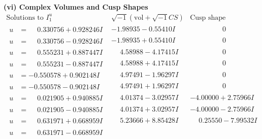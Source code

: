 \documentclass[1p]{elsarticle_modified}
\theoremstyle{definition}
\newcommand{\I}{\sqrt{-1}}
\begin{document}
\newpage\flushleft \textbf{(vi) Complex Volumes and Cusp Shapes}
$$\begin{array}{c|c|c}  
\text{Solutions to }I^u_{1}& \I (\text{vol} + \sqrt{-1}CS) & \text{Cusp shape}\\
 \hline 
\begin{aligned}
u &= \phantom{-}0.330756 + 0.928246 I\end{aligned}
 & -1.98935 - 0.55410 I & \phantom{-0.000000 } 0 \\ \hline\begin{aligned}
u &= \phantom{-}0.330756 - 0.928246 I\end{aligned}
 & -1.98935 + 0.55410 I & \phantom{-0.000000 } 0 \\ \hline\begin{aligned}
u &= \phantom{-}0.555231 + 0.887447 I\end{aligned}
 & \phantom{-}4.58988 - 4.17415 I & \phantom{-0.000000 } 0 \\ \hline\begin{aligned}
u &= \phantom{-}0.555231 - 0.887447 I\end{aligned}
 & \phantom{-}4.58988 + 4.17415 I & \phantom{-0.000000 } 0 \\ \hline\begin{aligned}
u &= -0.550578 + 0.902148 I\end{aligned}
 & \phantom{-}4.97491 - 1.96297 I & \phantom{-0.000000 } 0 \\ \hline\begin{aligned}
u &= -0.550578 - 0.902148 I\end{aligned}
 & \phantom{-}4.97491 + 1.96297 I & \phantom{-0.000000 } 0 \\ \hline\begin{aligned}
u &= \phantom{-}0.021905 + 0.940885 I\end{aligned}
 & \phantom{-}4.01374 - 3.02957 I & -4.00000 + 2.75966 I \\ \hline\begin{aligned}
u &= \phantom{-}0.021905 - 0.940885 I\end{aligned}
 & \phantom{-}4.01374 + 3.02957 I & -4.00000 - 2.75966 I \\ \hline\begin{aligned}
u &= \phantom{-}0.631971 + 0.668959 I\end{aligned}
 & \phantom{-}5.23666 + 8.85428 I & \phantom{-}0.25550 - 7.99532 I \\ \hline\begin{aligned}
u &= \phantom{-}0.631971 - 0.668959 I\end{aligned}

\end{array}$$
\end{document}
